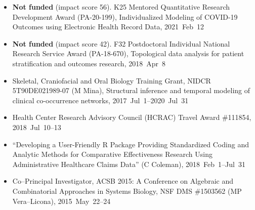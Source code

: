 \documentclass[10pt,a4paper]{article}
\begin{document}
\begin{itemize}[label=$\circ$,nolistsep]
\item
{\bfseries Not funded} (impact score 56). K25 Mentored Quantitative Research Development Award (PA-20-199), Individualized Modeling of COVID-19 Outcomes using Electronic Health Record Data, 2021~Feb~12
\item
{\bfseries Not funded} (impact score 42). F32 Postdoctoral Individual National Research Service Award (PA-18-670), Topological data analysis for patient stratification and outcomes
research, 2018~Apr~8
\item
Skeletal, Craniofacial and Oral Biology Training Grant, NIDCR 5T90DE021989-07 (M Mina), Structural inference and temporal modeling of clinical co-occurrence networks, 2017~Jul~1--2020~Jul~31
\item
Health Center Research Advisory Council (HCRAC) Travel Award \#111854, 2018~Jul~10--13
\item
``Developing a User-Friendly R Package Providing Standardized Coding and Analytic Methods for Comparative Effectiveness Research Using Administrative Healthcare Claims Data'' (C Coleman), 2018~Feb~1--Jul~31
\item
Co--Principal Investigator, ACSB 2015: A Conference on Algebraic and Combinatorial Approaches in Systems Biology, NSF DMS \#1503562 (MP Vera--Licona), 2015~May~22--24
\end{itemize}
\end{document}
